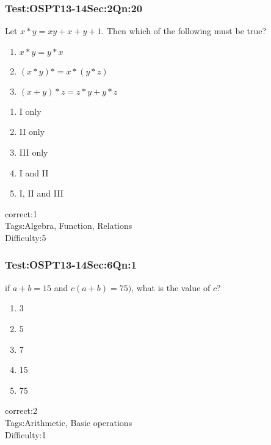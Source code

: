 \documentclass[]{beamer}
\begin{document}
    \begin{frame}
	    \frametitle{Test:OSPT13-14\hspace{2mm}Sec:2\hspace{2mm}Qn:20}
	    Let $x*y=xy+x+y+1$. Then which of the following must be true?
	   \begin{enumerate}[I]
	    	\item
	    		$x*y=y*x$
	    	\item
	    		$(x*y)*=x*(y*z)$
	    	\item
	    		$(x+y)*z=z*y+y*z$	
	   \end{enumerate}
	   \begin{enumerate}
	        \item
	           I only
	        \item
	           II only 
	        \item
	           III only
	        \item
	            I and II
	        \item
	           I, II and III
	    \end{enumerate}
	    correct:1\\   
	    Tags:Algebra, Function, Relations \\
	    Difficulty:5   \\
    \end{frame}    
    \begin{frame}
	    \frametitle{Test:OSPT13-14\hspace{2mm}Sec:6\hspace{2mm}Qn:1}
	    if $a+b=15$ and $c(a+b)=75)$, what is the value of $c$?
	   \begin{enumerate}
	        \item
	            3
	        \item
	            5
	        \item
	           7
	        \item
	            15
	        \item
	           75
	    \end{enumerate}
	    correct:2\\   
	    Tags:Arithmetic, Basic operations \\
	    Difficulty:1   \\
    \end{frame}    
\end{document}
